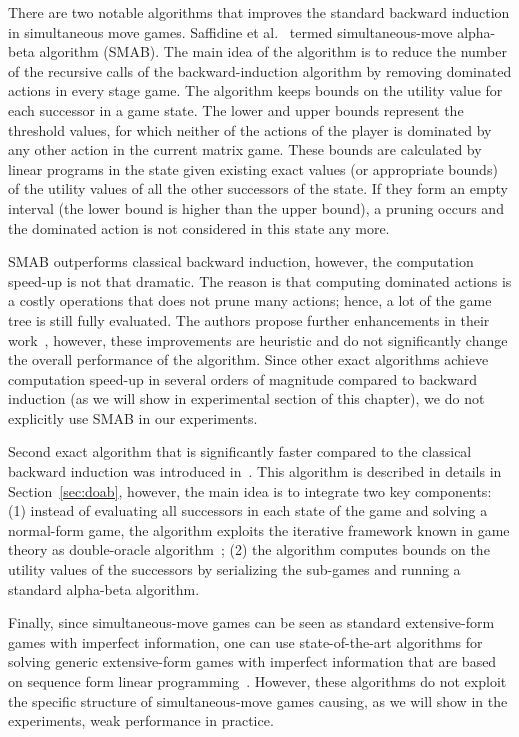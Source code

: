 There are two notable algorithms that improves the standard backward induction in simultaneous move games. 
Saffidine et al.~\cite{Saffidine12SMAB} termed simultaneous-move alpha-beta algorithm (SMAB). 
The main idea of the algorithm is to reduce the number of the recursive calls of the backward-induction algorithm by removing dominated actions in every stage game. The algorithm keeps bounds on the utility value for each successor in a game state. 
The lower and upper bounds represent the threshold values, for which neither of the actions of the player is dominated by any other action in the current matrix game. These bounds are calculated by linear programs in the state given existing exact values (or appropriate bounds) of the utility values of all the other successors of the state. If they form an empty interval (the lower bound is higher than the upper bound), a pruning occurs and the dominated action is not considered in this state any more. 

SMAB outperforms classical backward induction, however, the computation speed-up is not that dramatic. 
The reason is that computing dominated actions is a costly operations that does not prune many actions; hence, a lot of the game tree is still fully evaluated. The authors propose further enhancements in their work~\cite{Saffidine12SMAB}, however, these improvements are heuristic and do not significantly change the overall performance of the algorithm. Since other exact algorithms achieve computation speed-up in several orders of magnitude compared to backward induction (as we will show in experimental section of this chapter), we do not explicitly use SMAB in our experiments.

Second exact algorithm that is significantly faster compared to the classical backward induction was introduced in~\cite{Bosansky13Using}.
This algorithm is described in details in Section~\ref{sec:doab}, however, the main idea is to integrate two key components: (1) instead of evaluating all successors in each state of the game and solving a normal-form game, the algorithm exploits the iterative framework known in game theory as double-oracle algorithm~\cite{McMahan03Planning}; (2) the algorithm computes bounds on the utility values of the successors by serializing the sub-games and running a standard alpha-beta algorithm. 

Finally, since simultaneous-move games can be seen as standard extensive-form games with imperfect information, one can use state-of-the-art algorithms for solving generic extensive-form games with imperfect information that are based on sequence form linear programming~\cite{koller1996,bosansky2013-aamas}. However, these algorithms do not exploit the specific structure of simultaneous-move games causing, as we will show in the experiments, weak performance in practice.

